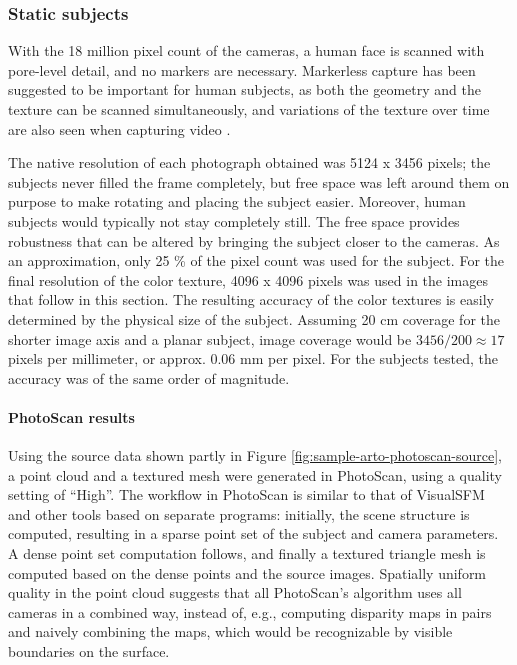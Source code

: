 \subsubsection{Static subjects}

With the 18 million pixel count of the cameras, a human face is scanned with pore-level detail, and no markers are necessary.
Markerless capture has been suggested to be important for human subjects, as both the geometry and the texture can be scanned simultaneously, and variations of the texture over time are also seen when capturing video \cite{bradley2010high}.

The native resolution of each photograph obtained was 5124 x 3456 pixels; the subjects never filled the frame completely, but free space was left around them on purpose to make rotating and placing the subject easier.
Moreover, human subjects would typically not stay completely still.
The free space provides robustness that can be altered by bringing the subject closer to the cameras.
As an approximation, only 25 \% of the pixel count was used for the subject.
For the final resolution of the color texture, 4096 x 4096 pixels was used in the images that follow in this section.
The resulting accuracy of the color textures is easily determined by the physical size of the subject.
Assuming 20 cm coverage for the shorter image axis and a planar subject, image coverage would be $3456 / 200 \approx 17$ pixels per millimeter, or approx. 0.06 mm per pixel.
For the subjects tested, the accuracy was of the same order of magnitude.

\paragraph{PhotoScan results}
Using the source data shown partly in Figure \ref{fig:sample-arto-photoscan-source}, a point cloud and a textured mesh were generated in PhotoScan, using a quality setting of ``High''.
The workflow in PhotoScan is similar to that of VisualSFM and other tools based on separate programs:
initially, the scene structure is computed, resulting in a sparse point set of the subject and camera parameters.
A dense point set computation follows, and finally a textured triangle mesh is computed based on the dense points and the source images.
Spatially uniform quality in the point cloud suggests that all PhotoScan's algorithm uses all cameras in a combined way, instead of, e.g., computing disparity maps in pairs and naively combining the maps, which would be recognizable by visible boundaries on the surface.

